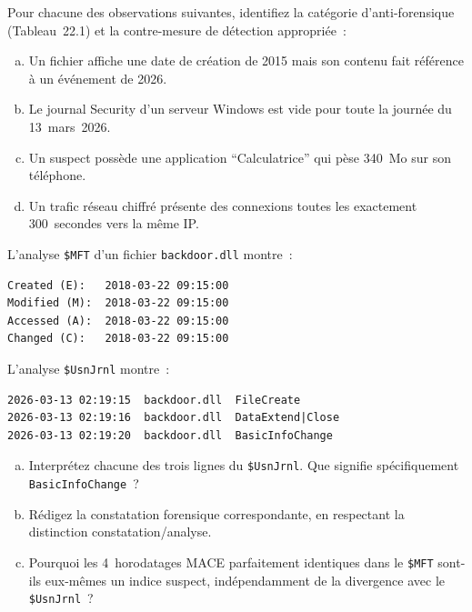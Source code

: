 \begin{boxexo}[title={\ding{45}\quad Exercice~22.1. Identifier les techniques \niveaubase}]
Pour chacune des observations suivantes, identifiez la catégorie
d'anti-forensique (Tableau~22.1) et la contre-mesure de détection
appropriée~:
\begin{enumerate}[(a)]
    \item Un fichier affiche une date de création de 2015 mais
          son contenu fait référence à un événement de 2026.
    \item Le journal Security d'un serveur Windows est vide pour
          toute la journée du 13~mars~2026.
    \item Un suspect possède une application ``Calculatrice''
          qui pèse 340~Mo sur son téléphone.
    \item Un trafic réseau chiffré présente des connexions toutes
          les exactement 300~secondes vers la même IP.
\end{enumerate}
\end{boxexo}

\begin{boxexo}[title={\ding{45}\quad Exercice~22.2. Détection de timestomping \niveaumoyen}]
L'analyse \texttt{\$MFT} d'un fichier \texttt{backdoor.dll} montre~:
\begin{lstlisting}[language=bash_forensique]
Created (E):   2018-03-22 09:15:00
Modified (M):  2018-03-22 09:15:00
Accessed (A):  2018-03-22 09:15:00
Changed (C):   2018-03-22 09:15:00
\end{lstlisting}
L'analyse \texttt{\$UsnJrnl} montre~:
\begin{lstlisting}[language=bash_forensique]
2026-03-13 02:19:15  backdoor.dll  FileCreate
2026-03-13 02:19:16  backdoor.dll  DataExtend|Close
2026-03-13 02:19:20  backdoor.dll  BasicInfoChange
\end{lstlisting}
\begin{enumerate}[(a)]
    \item Interprétez chacune des trois lignes du \texttt{\$UsnJrnl}.
          Que signifie spécifiquement \texttt{BasicInfoChange}~?
    \item Rédigez la constatation forensique correspondante,
          en respectant la distinction constatation/analyse.
    \item Pourquoi les 4~horodatages MACE parfaitement identiques
          dans le \texttt{\$MFT} sont-ils eux-mêmes un indice
          suspect, indépendamment de la divergence avec le
          \texttt{\$UsnJrnl}~?
\end{enumerate}
\end{boxexo}

